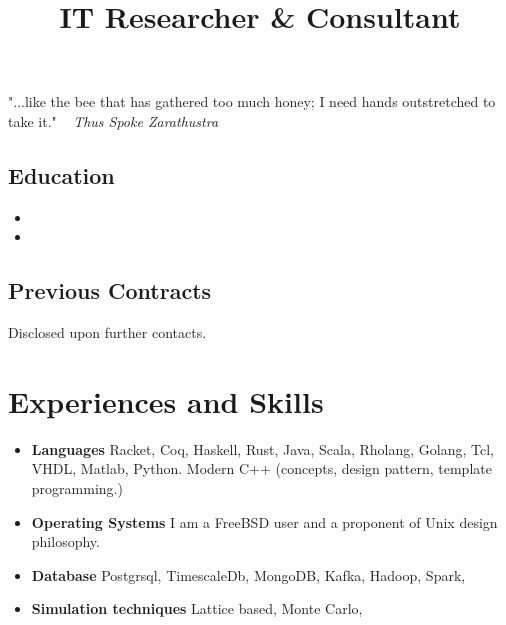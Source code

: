\documentclass[11pt,a4paper,sans]{moderncv}        %
\title{\small{IT Researcher \& Consultant }}                               %
\begin{document}
\makecvtitle

\small{"...like the bee that has gathered too much honey; I need hands outstretched to take it." ~ \textit{\tiny{Thus Spoke Zarathustra}}}

\subsection{Education}

\vspace{5pt}

\begin{itemize}

\item{}

\item{}  %


\end{itemize}

\vspace{2pt}

\subsection{Previous Contracts}
Disclosed upon further contacts.
\vspace{5pt}



\section{Experiences and Skills}

\vspace{6pt}

\begin{itemize}

\item \textbf{Languages} Racket, Coq, Haskell, Rust, Java, Scala, Rholang, Golang, Tcl, VHDL, Matlab, Python. Modern C++ (concepts, design pattern, template programming.)  
\item{\textbf{Operating Systems}} I am a FreeBSD user and a proponent of Unix design philosophy.
\item \textbf{Database} Postgrsql, TimescaleDb, MongoDB, Kafka, Hadoop, Spark, \item \textbf{Simulation techniques} Lattice based, Monte Carlo,
\end{itemize}
\end{document}
